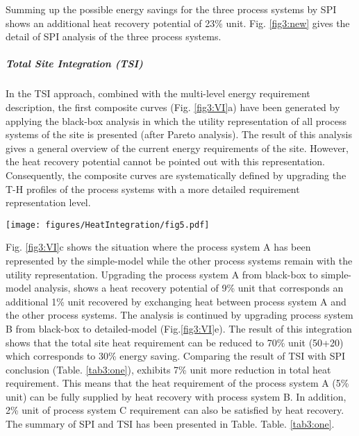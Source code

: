  Summing up the possible energy savings for the three process systems by SPI shows an additional heat recovery potential of 23\% unit. Fig. \ref{fig3:new} gives the detail of SPI analysis of the three process systems.
 
\subparagraph{Total Site Integration (TSI)}

In the TSI approach, combined with the multi-level energy requirement description, the first composite curves (Fig. \ref{fig3:VI}a) have been generated by applying the black-box analysis in which the utility representation of all process systems of the site is presented (after Pareto analysis). The result of this analysis gives a general overview of the current energy requirements of the site. However, the heat recovery potential cannot be pointed out with this representation. Consequently, the composite curves are systematically defined by upgrading the T-H profiles of the process systems with a more detailed requirement representation level.
 
 \begin{figure*}[!ht]
\vspace{5mm}
\begin{center}
\texttt{[image: figures/HeatIntegration/fig5.pdf]}
\caption{Systematic improvement of Composite and Grand Composite Curves of total site by combining different energy requirement levels (100\% corresponds to the present total site consumption)}
\label{fig3:VI}
\end{center}
\end{figure*}

 Fig. \ref{fig3:VI}c shows the situation where the process system A has been represented by the simple-model while the other process systems remain with the utility representation. Upgrading the process system A from black-box to simple-model analysis, shows a heat recovery potential of 9\% unit that corresponds an additional 1\% unit recovered by exchanging heat between process system A and the other process systems. The analysis is continued by upgrading process system B from black-box to detailed-model (Fig.\ref{fig3:VI}e). The result of this integration shows that the total site heat requirement can be reduced to 70\% unit (50+20) which corresponds to 30\% energy saving. Comparing the result of TSI with SPI conclusion (Table. \ref{tab3:one}), exhibits 7\% unit more reduction in total heat requirement. This means that the heat requirement of the process system A (5\% unit) can be fully supplied by heat recovery with process system B. In addition, 2\% unit of process system C requirement can also be satisfied by heat recovery. The summary of SPI and TSI has been presented in Table. Table. \ref{tab3:one}. 
 
